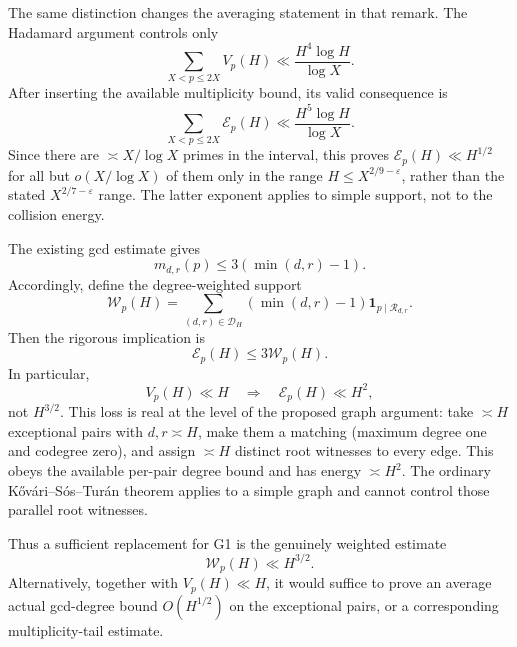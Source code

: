 The same distinction changes the averaging statement in that remark.
The Hadamard argument controls only
\[
 \sum_{X<p\leq2X}V_p(H)\ll\frac{H^4\log H}{\log X}.
\]
After inserting the available multiplicity bound, its valid consequence is
\[
 \sum_{X<p\leq2X}\mathcal E_p(H)
 \ll\frac{H^5\log H}{\log X}.
\]
Since there are $\asymp X/\log X$ primes in the interval, this proves
$\mathcal E_p(H)\ll H^{1/2}$ for all but $o(X/\log X)$ of them only in
the range $H\leq X^{2/9-\varepsilon}$, rather than the stated
$X^{2/7-\varepsilon}$ range.  The latter exponent applies to simple
support, not to the collision energy.

The existing gcd estimate gives
\[
 m_{d,r}(p)\leq3(\min(d,r)-1).
\]
Accordingly, define the degree-weighted support
\[
 \mathcal W_p(H)=
 \sum_{(d,r)\in\mathscr D_H}
 (\min(d,r)-1)\mathbf1_{p\mid\mathcal R_{d,r}}.
\]
Then the rigorous implication is
\begin{equation}\label{eq:meso-weighted-energy}
 \mathcal E_p(H)\leq3\mathcal W_p(H).
\end{equation}
In particular,
\begin{equation}\label{eq:meso-V-only}
 V_p(H)\ll H\quad\Longrightarrow\quad
 \mathcal E_p(H)\ll H^2,
\end{equation}
not $H^{3/2}$.  This loss is real at the level of the proposed graph
argument: take $\asymp H$ exceptional pairs with $d,r\asymp H$, make them
a matching (maximum degree one and codegree zero), and assign
$\asymp H$ distinct root witnesses to every edge.  This obeys the available
per-pair degree bound and has energy $\asymp H^2$.  The ordinary
K\H{o}v\'ari--S\'os--Tur\'an theorem applies to a simple graph and cannot
control those parallel root witnesses.

Thus a sufficient replacement for G1 is the genuinely weighted estimate
\begin{equation}\label{eq:meso-missing-weighted}
 \boxed{\mathcal W_p(H)\ll H^{3/2}.}
\end{equation}
Alternatively, together with $V_p(H)\ll H$, it would suffice to prove an
average actual gcd-degree bound $O(H^{1/2})$ on the exceptional pairs, or
a corresponding multiplicity-tail estimate.

